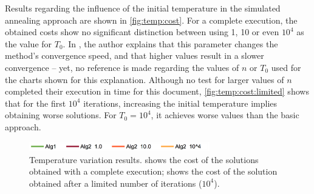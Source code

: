 Results regarding the influence of the initial temperature in the simulated annealing approach are shown in \cref{fig:temp:cost}. For a complete execution, the obtained costs show no significant distinction between using 1, 10 or even $10^{4}$ as the value for $T_{0}$. In \cite{Quinn2004}, the author explains that this parameter changes the method's convergence speed, and that higher values result in a slower convergence -- yet, no reference is made regarding the values of $n$ or $T_{0}$ used for the charts shown for this explanation. Although no test for larger values of $n$ completed their execution in time for this document, \cref{fig:temp:cost:limited} shows that for the first $10^{4}$ iterations, increasing the initial temperature implies obtaining worse solutions. For $T_{0}=10^{4}$, it achieves worse values than the basic approach.

\begin{figure}[!htp]
	\centering
	\includegraphics[width=0.7\textwidth]{report/images/temp-leg.png}

	\hfill
	\caption[Temperature Variations]{Temperature variation results.  shows the cost of the solutions obtained with a complete execution;
	 shows the cost of the solution obtained after a limited number of iterations ($10^{4}$).
	}
	\label{fig:temp}
\end{figure}
